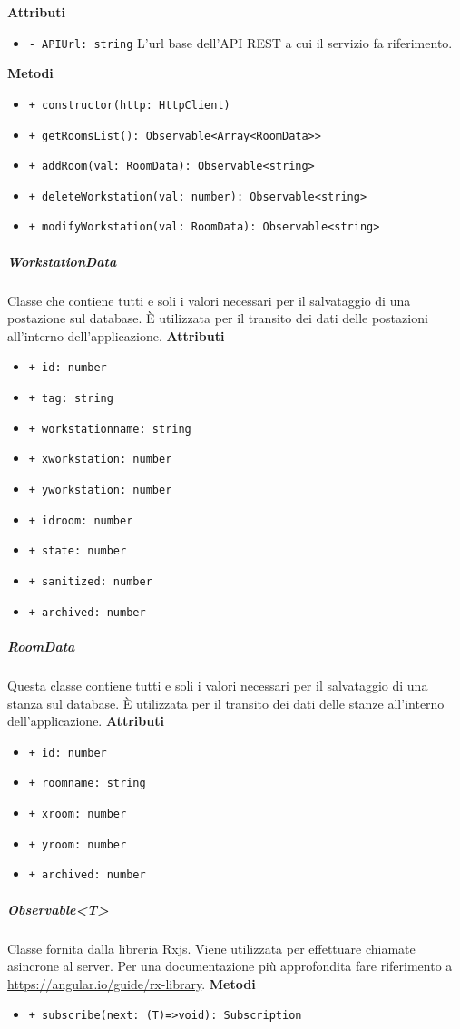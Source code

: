 \textbf{Attributi}
\begin{itemize}
	\item \texttt{- APIUrl: string} \newline
	L'url base dell'API REST a cui il servizio fa riferimento.
\end{itemize}
\textbf{Metodi}
\begin{itemize}
	\item \texttt{+ constructor(http: HttpClient) 	}
	\item \texttt{+ getRoomsList(): Observable<Array<RoomData>> 	}
	\item \texttt{+ addRoom(val: RoomData): Observable<string> 	}
	\item \texttt{+ deleteWorkstation(val: number): Observable<string> 	}
	\item \texttt{+ modifyWorkstation(val: RoomData): Observable<string>}
\end{itemize}
\subparagraph{WorkstationData}
Classe che contiene tutti e soli i valori necessari per il salvataggio di una postazione sul database. È utilizzata per il transito dei dati delle postazioni all'interno dell'applicazione. \newline
\textbf{Attributi}
\begin{itemize}
	\item \texttt{+ id: number 	}
	\item \texttt{+ tag: string 	}
	\item \texttt{+ workstationname: string 	}
	\item \texttt{+ xworkstation: number 	}
	\item \texttt{+ yworkstation: number 	}
	\item \texttt{+ idroom: number 	}
	\item \texttt{+ state: number 	}
	\item \texttt{+ sanitized: number 	}
	\item \texttt{+ archived: number}
\end{itemize}
\subparagraph{RoomData}
Questa classe contiene tutti e soli i valori necessari per il salvataggio di una stanza sul database. È utilizzata per il transito dei dati delle stanze all'interno dell'applicazione. \newline
\textbf{Attributi}
\begin{itemize}
	\item \texttt{+ id: number 	}
	\item \texttt{+ roomname: string 	}
	\item \texttt{+ xroom: number 	}
	\item \texttt{+ yroom: number 	}
	\item \texttt{+ archived: number}
\end{itemize}
\subparagraph{Observable<T>}
Classe fornita dalla libreria Rxjs. Viene utilizzata per effettuare chiamate asincrone al server. Per una documentazione più approfondita fare riferimento a \url{https://angular.io/guide/rx-library}. \newline
\textbf{Metodi}
\begin{itemize}
	\item \texttt{+ subscribe(next: (T)=>void): Subscription}
\end{itemize}

